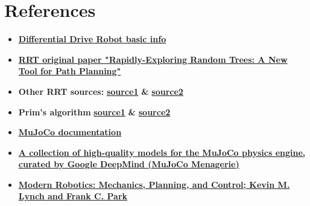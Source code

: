 \documentclass{beamer}
\begin{document}
\section{References}
\begin{frame}{\insertsection}
    \begin{itemize}
        \item \href{https://en.wikipedia.org/wiki/Differential_wheeled_robot}{\textbf{Differential Drive Robot basic info}}
        \item \href{https://msl.cs.illinois.edu/~lavalle/papers/Lav98c.pdf}{\textbf{RRT original paper "Rapidly-Exploring Random Trees: A New Tool for Path Planning"}}
        \item \textbf{Other RRT sources:} \href{https://en.wikipedia.org/wiki/Rapidly_exploring_random_tree}{\textbf{source1}} \textbf{\&} \href{https://theclassytim.medium.com/robotic-path-planning-rrt-and-rrt-212319121378}{\textbf{source2}}
        \item \textbf{Prim's algorithm} \href{\detokenize{https://en.wikipedia.org/wiki/Prims_algorithm}}{\textbf{source1}} \textbf{\&} \href{https://www.geeksforgeeks.org/dsa/prims-minimum-spanning-tree-mst-greedy-algo-5/}{\textbf{source2}}
        \item \href{https://mujoco.readthedocs.io/en/stable/overview.html}{\textbf{MuJoCo documentation}}
        \item \href{https://github.com/google-deepmind/mujoco_menagerie}{\textbf{A collection of high-quality models for the MuJoCo physics engine, curated by Google DeepMind (MuJoCo Menagerie)}}
        \item \href{https://hades.mech.northwestern.edu/images/7/7f/MR.pdf}{\textbf{Modern Robotics: Mechanics, Planning, and Control; Kevin M. Lynch and Frank C. Park}}
    \end{itemize}
\end{frame}
\end{document}
